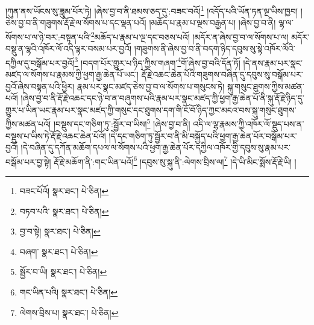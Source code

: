 །ཀུན་ནས་ཡོངས་སུ་ཟླུམ་པོར་ཏེ། །ཞེས་བྱ་བ་ནི་ཐམས་ཅད་དུ་:བཟང་བའོ།\footnote{བཟང་པོའོ།  སྣར་ཐང་།  པེ་ཅིན། } །འདོད་པའི་ཡོན་ཏན་ལྔ་ཡིས་ཁྱབ། །ཅེས་བྱ་བ་ནི་གཟུགས་རྡོ་རྗེ་ལ་སོགས་པ་དང་ལྡན་པའོ། །མཆོད་པ་རྣམ་པ་ལྔས་བརྒྱན་པ། །ཞེས་བྱ་བ་ནི། ལྷ་ལ་སོགས་པ་ལ་ཉེ་བར་:བསྟན་པའི་\footnote{བཏབ་པའི་  སྣར་ཐང་།  པེ་ཅིན། }མཆོད་པ་རྣམ་པ་ལྔ་དང་བཅས་པའོ། །མདོར་ན་ཞེས་བྱ་བ་ལ་སོགས་པ་ལ། མདོར་བསྡུ་ན་ལྷའི་འཁོར་ལོ་འདི་ལྟར་བསམ་པར་བྱའོ། །གཟུགས་ནི་ཞེས་བྱ་བ་ནི་བདག་ཉིད་དབུས་སུ་སྟེ་འཁོར་ལོའི་དཀྱིལ་དུ་བསྒོམ་པར་བྱའོ།\footnote{བྱ་བ་སྟེ།  སྣར་ཐང་།  པེ་ཅིན། } །བདག་པོར་གྱུར་པ་ཉིད་ཀྱིས་གཞག་\footnote{བཞག་  སྣར་ཐང་།  པེ་ཅིན། }གོ་ཞེས་བྱ་བའི་དོན་ཏོ། །དེ་ནས་རྣམ་པར་སྣང་མཛད་ལ་སོགས་པ་རྣམས་ཀྱི་ཕྱག་རྒྱ་ཆེན་པོ་ཡང་། རྡོ་རྗེ་འཆང་ཆེན་པོའི་གཟུགས་བཞིན་དུ་དབུས་སུ་བསྒོམ་པར་བྱའོ་ཞེས་བསྟན་པའི་ཕྱིར། རྣམ་པར་སྣང་མཛད་ཅེས་བྱ་བ་ལ་སོགས་པ་གསུངས་ཏེ། སྐུ་གསུང་ཐུགས་ཀྱིས་མཚན་པའོ། །ཞེས་བྱ་བ་ནི་རྡོ་རྗེ་འཆང་དང་ཉེ་བ་ན་བཞུགས་པའི་རྣམ་པར་སྣང་མཛད་ཀྱི་ཕྱག་རྒྱ་ཆེན་པོ་ནི་སྐུ་རྡོ་རྗེ་ཉིད་དུ་གྱུར་པ་ཡིན་ཡང་རྣམ་པར་སྣང་མཛད་ཀྱི་གསུང་དང་ཐུགས་དག་གི་ངོ་བོ་ཉིད་ཀྱང་མངའ་བས་སྐུ་གསུང་ཐུགས་ཀྱིས་མཚན་པའོ། །བསྡུས་དང་གཅིག་ཏུ་:སྦྱོར་བ་ཡིས།\footnote{སྦྱོར་བ་ཡི།  སྣར་ཐང་།  པེ་ཅིན། } །ཞེས་བྱ་བ་ནི། འདི་ལ་ལྷ་རྣམས་ཀྱི་འཁོར་ལོ་སྡུད་པས་ན་བསྡུས་པ་ཡིས་ཏེ་རྡོ་རྗེ་འཆང་ཆེན་པོའོ། །དེ་དང་གཅིག་ཏུ་སྦྱོར་བ་ནི་མི་བསྐྱོད་པའི་ཕྱག་རྒྱ་ཆེན་པོར་བསྒོམ་པར་བྱའོ། །དེ་བཞིན་དུ་དཀོན་མཆོག་དཔལ་ལ་སོགས་པའི་ཕྱག་རྒྱ་ཆེན་པོར་དཀྱིལ་འཁོར་གྱི་དབུས་སུ་རྣམ་པར་བསྒོམ་པར་བྱ་སྟེ། རྡོ་རྗེ་མཆོག་ནི་:གང་ཡིན་པའོ།\footnote{གང་ཡིན་པའི།  སྣར་ཐང་།  པེ་ཅིན། } །དབུས་སུ་སྐུ་ནི་:ལེགས་བྲིས་ལ།\footnote{ལེགས་བྲིས་པ།  སྣར་ཐང་།  པེ་ཅིན། } །དེ་ཡི་མིང་སྨོས་རྡོ་རྗེ་ཡི། །
